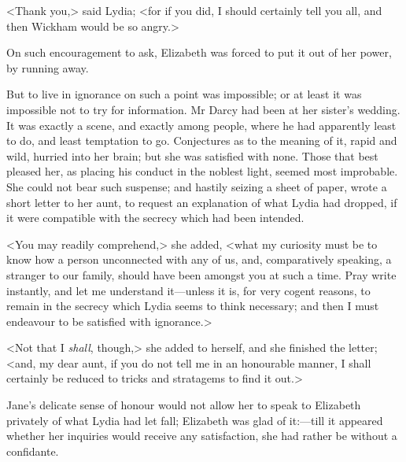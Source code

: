 <Thank you,> said Lydia; <for if you did, I should certainly tell you all, and then Wickham would be so angry.>

On such encouragement to ask, Elizabeth was forced to put it out of her power, by running away.

But to live in ignorance on such a point was impossible; or at least it was impossible not to try for information. Mr Darcy had been at her sister's wedding. It was exactly a scene, and exactly among people, where he had apparently least to do, and least temptation to go. Conjectures as to the meaning of it, rapid and wild, hurried into her brain; but she was satisfied with none. Those that best pleased her, as placing his conduct in the noblest light, seemed most improbable. She could not bear such suspense; and hastily seizing a sheet of paper, wrote a short letter to her aunt, to request an explanation of what Lydia had dropped, if it were compatible with the secrecy which had been intended.

<You may readily comprehend,> she added, <what my curiosity must be to know how a person unconnected with any of us, and, comparatively speaking, a stranger to our family, should have been amongst you at such a time. Pray write instantly, and let me understand it—unless it is, for very cogent reasons, to remain in the secrecy which Lydia seems to think necessary; and then I must endeavour to be satisfied with ignorance.>

<Not that I \textit{shall}, though,> she added to herself, and she finished the letter; <and, my dear aunt, if you do not tell me in an honourable manner, I shall certainly be reduced to tricks and stratagems to find it out.>

Jane's delicate sense of honour would not allow her to speak to Elizabeth privately of what Lydia had let fall; Elizabeth was glad of it:—till it appeared whether her inquiries would receive any satisfaction, she had rather be without a confidante.